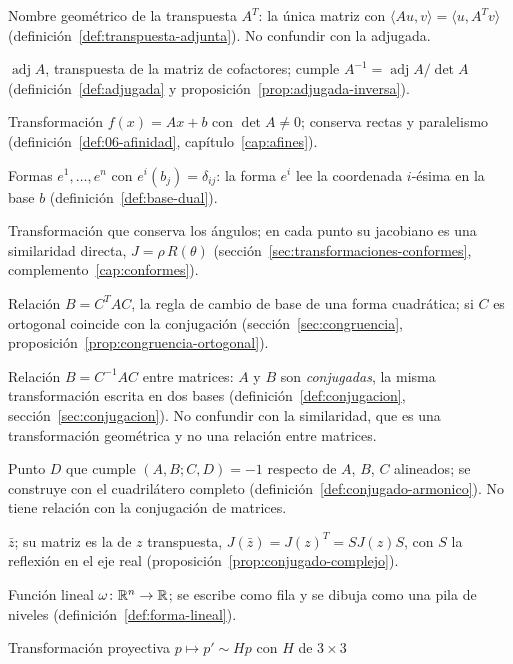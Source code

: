 \begin{description}[style=nextline,leftmargin=1.2em,itemsep=2pt]
\item[Adjunta] Nombre geométrico de la transpuesta \(A^T\): la única matriz con
\(\langle Au,v\rangle=\langle u,A^Tv\rangle\) (definición~\ref{def:transpuesta-adjunta}).
No confundir con la adjugada.
\item[Adjugada] \(\operatorname{adj}A\), transpuesta de la matriz de cofactores; cumple
\(A^{-1}=\operatorname{adj}A/\det A\) (definición~\ref{def:adjugada} y proposición~\ref{prop:adjugada-inversa}).
\item[Afinidad] Transformación \(f(x)=Ax+b\) con \(\det A\neq0\); conserva rectas y
paralelismo (definición~\ref{def:06-afinidad}, capítulo~\ref{cap:afines}).
\item[Base dual] Formas \(e^1,\dots,e^n\) con \(e^i(b_j)=\delta_{ij}\): la forma \(e^i\) lee
la coordenada \(i\)-ésima en la base \(b\) (definición~\ref{def:base-dual}).
\item[Conforme] Transformación que conserva los ángulos; en cada punto su jacobiano es una
similaridad directa, \(J=\rho\,R(\theta)\) (sección~\ref{sec:transformaciones-conformes},
complemento~\ref{cap:conformes}).
\item[Congruencia] Relación \(B=C^TAC\), la regla de cambio de base de una forma cuadrática;
si \(C\) es ortogonal coincide con la conjugación (sección~\ref{sec:congruencia},
proposición~\ref{prop:congruencia-ortogonal}).
\item[Conjugación] Relación \(B=C^{-1}AC\) entre matrices: \(A\) y \(B\) son
\emph{conjugadas}, la misma transformación escrita en dos bases (definición~\ref{def:conjugacion},
sección~\ref{sec:conjugacion}). No confundir con la similaridad, que es una transformación
geométrica y no una relación entre matrices.
\item[Conjugado armónico] Punto \(D\) que cumple \((A,B;C,D)=-1\) respecto de \(A\), \(B\),
\(C\) alineados; se construye con el cuadrilátero completo (definición~\ref{def:conjugado-armonico}).
No tiene relación con la conjugación de matrices.
\item[Conjugado complejo] \(\bar z\); su matriz es la de \(z\) transpuesta,
\(J(\bar z)=J(z)^T=SJ(z)S\), con \(S\) la reflexión en el eje real
(proposición~\ref{prop:conjugado-complejo}).
\item[Forma lineal] Función lineal \(\omega\colon\mathbb{R}^n\to\mathbb{R}\); se escribe como fila y se
dibuja como una pila de niveles (definición~\ref{def:forma-lineal}).
\item[Homografía] Transformación proyectiva \(p\mapsto p'\sim Hp\) con \(H\) de \(3\times3\)

\end{description}
